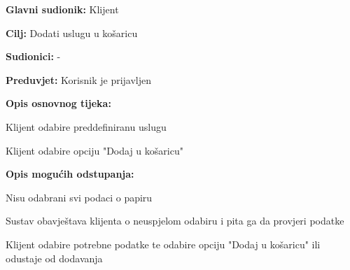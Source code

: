 					\noindent {}
					\begin{packed_item}
						
						\item \textbf{Glavni sudionik: } Klijent
						\item  \textbf{Cilj:} Dodati uslugu u košaricu
						\item  \textbf{Sudionici:} -
						\item  \textbf{Preduvjet:} Korisnik je prijavljen
						\item  \textbf{Opis osnovnog tijeka:}
						
						\item[] \begin{packed_enum}
							
							\item Klijent odabire preddefiniranu uslugu
							\item Klijent odabire opciju "Dodaj u košaricu"
						\end{packed_enum}
					
						\item  \textbf{Opis mogućih odstupanja:}
						
						\item[] \begin{packed_item}
							
							\item[2.a]  Nisu odabrani svi podaci o papiru
							\item[] \begin{packed_enum}
								
								\item Sustav obavještava klijenta o neuspjelom odabiru i pita ga da provjeri podatke
								\item  Klijent odabire potrebne podatke te odabire opciju "Dodaj u košaricu" ili odustaje od dodavanja
							\end{packed_enum}
						\end{packed_item}
					\end{packed_item}
				
